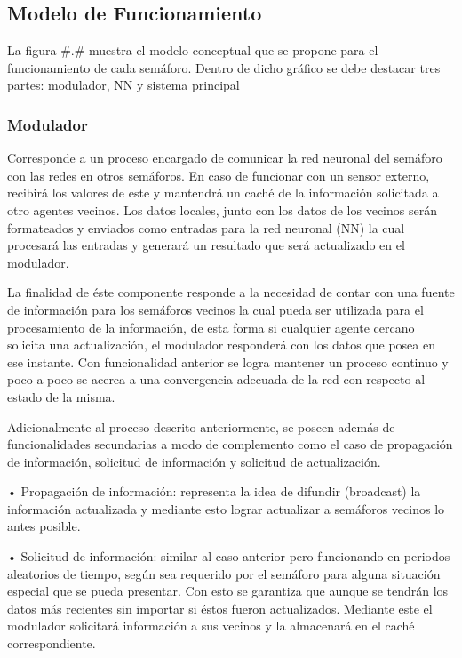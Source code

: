 \subsection{Modelo de Funcionamiento}

La figura #.# muestra el modelo conceptual que se propone para el funcionamiento de cada sem\'{a}foro. Dentro de dicho gr\'{a}fico se debe destacar tres partes: modulador, NN y sistema principal


\subsubsection{Modulador}

Corresponde a un proceso encargado de comunicar la red neuronal del sem\'{a}foro con las redes en otros sem\'{a}foros. En caso de funcionar con un sensor externo, recibir\'{a} los valores de este y mantendr\'{a} un cach\'{e} de la informaci\'{o}n solicitada a otro agentes vecinos. Los datos locales, junto con los datos de los vecinos ser\'{a}n formateados y enviados como entradas para la red neuronal (NN) la cual procesar\'{a} las entradas y generar\'{a} un resultado que ser\'{a} actualizado en el modulador.

La finalidad de \'{e}ste componente responde a la necesidad de contar con una fuente de informaci\'{o}n para los sem\'{a}foros vecinos la cual pueda ser utilizada para el procesamiento de la informaci\'{o}n, de esta forma si cualquier agente cercano solicita una actualizaci\'{o}n, el modulador responder\'{a} con los datos que posea en ese instante. Con funcionalidad anterior se logra mantener un proceso continuo y poco a poco se acerca a una convergencia adecuada de la red con respecto al estado de la misma.

Adicionalmente al proceso descrito anteriormente, se poseen adem\'{a}s de funcionalidades secundarias a modo de complemento como el caso de propagaci\'{o}n de informaci\'{o}n, solicitud de informaci\'{o}n y solicitud de actualizaci\'{o}n.

•	Propagaci\'{o}n de informaci\'{o}n: representa la idea de difundir (broadcast) la informaci\'{o}n actualizada y mediante esto lograr actualizar a sem\'{a}foros vecinos lo antes posible.

•	Solicitud de informaci\'{o}n: similar al caso anterior pero funcionando en periodos aleatorios de tiempo, seg\'{u}n sea requerido por el sem\'{a}foro para alguna situaci\'{o}n especial que se pueda presentar. Con esto se garantiza que aunque se tendr\'{a}n los datos m\'{a}s recientes sin importar si \'{e}stos fueron actualizados. Mediante este el modulador solicitar\'{a} informaci\'{o}n a sus vecinos y la almacenar\'{a} en el cach\'{e} correspondiente.


